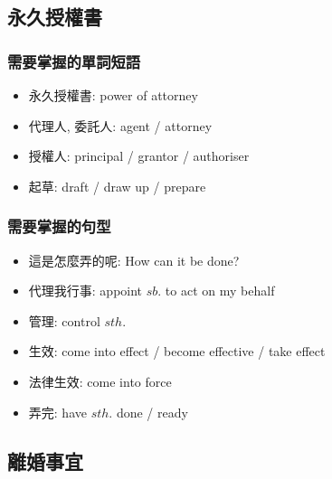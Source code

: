 \subsection{永久授權書}
\subsubsection*{需要掌握的單詞短語}
\begin{multicols}{2}
\begin{itemize}
  \itemsep0em
  \item 永久授權書:  power of attorney
  \item 代理人, 委託人: agent / attorney
  \item 授權人: principal / grantor / authoriser
  \item 起草: draft / draw up / prepare
\end{itemize}
\end{multicols}

\subsubsection*{需要掌握的句型}
\begin{multicols}{2}
\begin{itemize}
  \itemsep0em
  \item 這是怎麼弄的呢: How can it be done?
  \item 代理我行事: appoint $sb.$ to act on my behalf
  \item 管理: control  $sth.$
  \item 生效: come into effect / become effective / take effect
  \item 法律生效: come into force
  \item 弄完: have $sth.$ done / ready
\end{itemize}
\end{multicols}

\subsection{離婚事宜}
